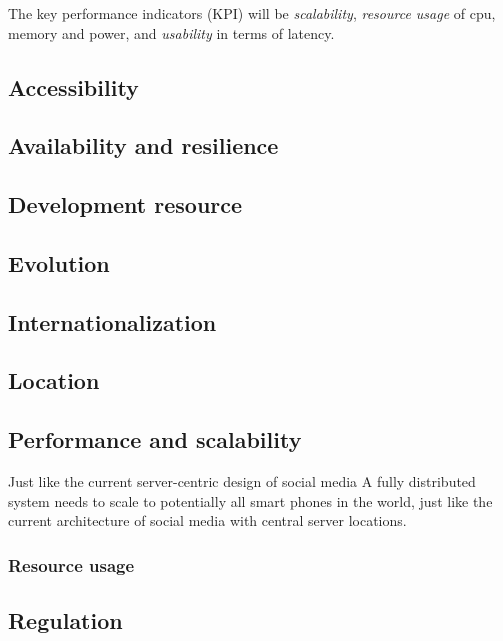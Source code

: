 
The key performance indicators (KPI) will be \emph{scalability}, \emph{resource usage} of cpu, memory and power, and \emph{usability} in terms of latency.


\subsection{Accessibility}

\subsection{Availability and resilience}

\subsection{Development resource}

\subsection{Evolution}

\subsection{Internationalization}

\subsection{Location}

\subsection{Performance and scalability}
Just like the current server-centric design of social media
A fully distributed system needs to scale to potentially all smart phones in the world, just like the current architecture of social media with central server locations.

\subsubsection{Resource usage}

\subsection{Regulation}

